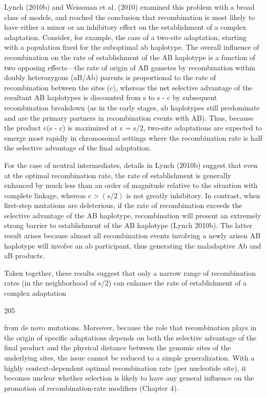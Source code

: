 \documentclass{article}
\begin{document}
Lynch (2010b) and Weissman et al. (2010) examined this problem with a broad class of models, and reached the conclusion that recombination is most likely to have either a minor or an inhibitory effect on the establishment of a complex adaptation. Consider, for example, the case of a two-site adaptation, starting with a population fixed for the suboptimal ab haplotype. The overall influence of recombination on the rate of establishment of the AB haplotype is a function of two opposing effects—the rate of origin of AB gametes by recombination within doubly heterozygous (aB/Ab) parents is proportional to the rate of recombination between the sites (c), whereas the net selective advantage of the resultant AB haplotypes is discounted from s to s - c by subsequent recombination breakdown (as in the early stages, ab haplotypes still predominate and are the primary partners in recombination events with AB). Thus, because the product c(s - c) is maximized at c = s/2, two-site adaptations are expected to emerge most rapidly in chromosomal settings where the recombination rate is half the selective advantage of the final adaptation.

For the case of neutral intermediates, details in Lynch (2010b) suggest that even at the optimal recombination rate, the rate of establishment is generally enhanced by much less than an order of magnitude relative to the situation with complete linkage, whereas  $ c > (s/2) $ is not greatly inhibitory. In contrast, when first-step mutations are deleterious, if the rate of recombination exceeds the selective advantage of the AB haplotype, recombination will present an extremely strong barrier to establishment of the AB haplotype (Lynch 2010b). The latter result arises because almost all recombination events involving a newly arisen AB haplotype will involve an ab participant, thus generating the maladaptive Ab and aB products.

Taken together, these results suggest that only a narrow range of recombination rates (in the neighborhood of s/2) can enhance the rate of establishment of a complex adaptation

205

from de novo mutations. Moreover, because the role that recombination plays in the origin of specific adaptations depends on both the selective advantage of the final product and the physical distance between the genomic sites of the underlying sites, the issue cannot be reduced to a simple generalization. With a highly context-dependent optimal recombination rate (per nucleotide site), it becomes unclear whether selection is likely to have any general influence on the promotion of recombination-rate modifiers (Chapter 4).
\end{document}
